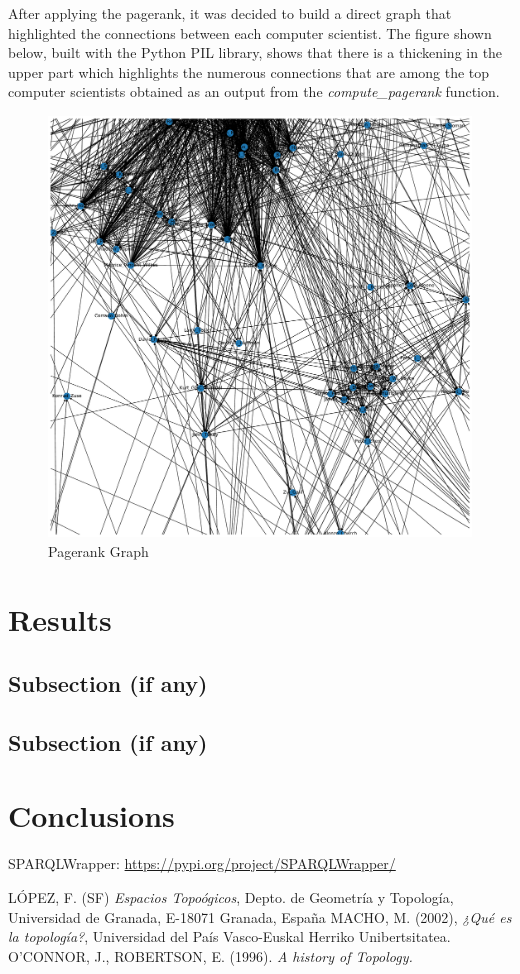 \documentclass[12pt, twoside]{article}
\begin{document}
\noindent
After applying the pagerank, it was decided to build a direct graph that highlighted the connections between each computer scientist. The figure shown below, built with the Python PIL library, shows that there is a thickening in the upper part which highlights the numerous connections that are among the top computer scientists obtained as an output from the \textit{compute\_pagerank} function.

\begin{figure}[htp]
\centering
\includegraphics[width = .69\textwidth]{images/my_graph}
\caption{Pagerank Graph}
\end{figure}

\newpage
\section{Results}
\lipsum[1] %
\subsection{Subsection (if any)}
\lipsum %
\subsection{Subsection (if any)}
\lipsum %

\newpage
\section{Conclusions}
\lipsum[5] %
\lipsum[1] %

\newpage


\begin{thebibliography}{X} %
	SPARQLWrapper: \href{https://pypi.org/project/SPARQLWrapper/}{https://pypi.org/project/SPARQLWrapper/}

 LÓPEZ, F. (SF) \textit{Espacios Topoógicos}, Depto. de Geometría y Topología, Universidad de Granada, E-18071 Granada, España
 MACHO, M. (2002), \textit{¿Qué es la topología?}, Universidad del País Vasco-Euskal Herriko Unibertsitatea.
 O’CONNOR, J., ROBERTSON, E. (1996). \textit{A history of Topology.}
\end{thebibliography}
\end{document}
